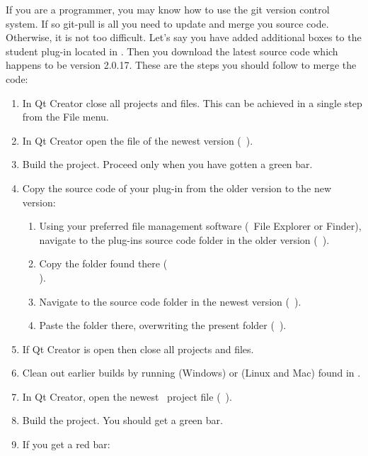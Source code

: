If you are a programmer, you may know how to use the git version control system. If so git-pull is all you need to update and merge you source code. Otherwise, it is not too difficult. Let's say you have added additional boxes to the student plug-in located in . Then you download the latest source code which happens to be version 2.0.17. These are the steps you should follow to merge the code:
\begin{enumerate}
\item In Qt Creator close all projects and files. This can be achieved in a single step from the File menu.
\item In Qt Creator open the  file of the newest version (\ie\ ).
\item Build the project. Proceed only when you have gotten a green bar.
\item Copy the source code of your plug-in from the older version to the new version:
\begin{enumerate}
\item Using your preferred file management software (\eg\ File Explorer or Finder), navigate to the plug-ins source code folder in the older version (\eg\ ).
\item Copy the  folder found there (\eg\ \\).
\item Navigate to the  source code folder in the newest version (\eg\ ).
\item Paste the  folder there, overwriting the present  folder (\eg\ ).
\end{enumerate}
\item If Qt Creator is open then close all projects and files.
\item Clean out earlier builds by running  (Windows) or  (Linux and Mac) found in \devhome.
\item In Qt Creator, open the newest \US\ project file (\eg\ ).
\item Build the project. You should get a green bar.
\item If you get a red bar:
\begin{enumerate}

\end{enumerate}
\end{enumerate}
